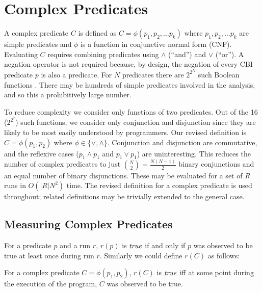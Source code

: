 
\section{Complex Predicates}
\label{sec-complex-preds}
A complex predicate $C$ is defined as $C = \phi(p_1, p_2, \ldots p_k)$ where 
$p_1, p_2, \ldots p_k$ are simple predicates and $\phi$ is a function in 
conjunctive normal form (CNF).  Evaluating $C$ requires combining predicates 
using $\wedge$ (``and'') and $\vee$ (``or'').  A negation operator is not required 
because, by design, the negation of every CBI predicate $p$ is also a predicate.  
For $N$ predicates there are $2^{2^N}$ such Boolean functions 
\cite{MathWorld:BoolFuncs}.  There may be hundreds of simple predicates involved 
in the analysis, and so this a prohibitively large number.

To reduce complexity we consider only functions of two predicates.  Out of the
16 ($2^{2^2}$) such functions, we consider only conjunction and disjunction since
they are likely to be most easily understood by programmers.  Our revised
definition is $C = \phi(p_1, p_2)$ where $\phi \in \{\vee, \wedge\}$.  Conjunction
and disjunction are commutative, and the reflexive cases ($p_1 \wedge p_1$ and 
$p_1 \vee p_1$) are uninteresting.  This reduces the number of complex predicates
to just ${N \choose 2} = \frac{N (N-1)}{2}$ binary conjunctions and an equal number 
of binary disjunctions.  These may be evaluated for a set of $R$ runs in $O(|R| N^2)$ 
time.  The revised definition for a complex predicate is used throughout; related
definitions may be trivially extended to the general case.

\subsection{Measuring Complex Predicates}
\label{sec-measuring}

For a predicate $p$ and a run $r$, $r(p)$ is $\mathit{true}$ if and only if $p$ was observed to be true at least once during run $r$.  Similarly we could define $r(C)$ as follows:
\begin{defn}
\label{dfn1}
For a complex predicate $C = \phi(p_1, p_2)$, $r(C)$ is $\mathit{true}$ iff at some point during the execution of the program, $C$ was observed to be true.
\end{defn}

